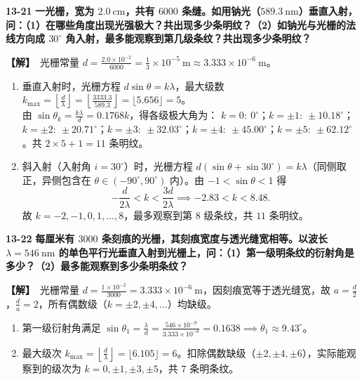 \documentclass[zihao=5,a4paper,UTF8]{ctexart}
\newenvironment{prob}[2]{%
    \par\vspace{6pt}\noindent\textbf{\color{navy}#1} \textbf{#2}\par\nopagebreak\vspace{2pt}%
}{%
    \par\vspace{4pt}%
}
\newcommand{\sol}{\noindent\textbf{\color{tealaccent}【解】}\ }
\begin{document}
\begin{prob}{13-21}{一光栅，宽为 $2.0\ \mathrm{cm}$，共有 $6000$ 条缝。如用钠光（$589.3\ \mathrm{nm}$）垂直入射，问：（1）在哪些角度出现光强极大？共出现多少条明纹？（2）如钠光与光栅的法线方向成 $30^\circ$ 角入射，最多能观察到第几级条纹？共出现多少条明纹？}
\sol 光栅常量 $d = \frac{2.0\times 10^{-2}}{6000} = \frac{1}{3}\times 10^{-5}\ \mathrm{m} \approx 3.333\times 10^{-6}\ \mathrm{m}$。
\begin{enumerate}[leftmargin=2em, itemsep=2pt]
    \item 垂直入射时，光栅方程 $d\sin\theta = k\lambda$，最大级数 $k_{\max} = \left\lfloor\frac{d}{\lambda}\right\rfloor = \left\lfloor\frac{3333.3}{589.3}\right\rfloor = \lfloor 5.656\rfloor = 5$。\\
    由 $\sin\theta_k = \frac{k\lambda}{d} = 0.1768k$，得各级极大角为：
    $k=0:\ 0^\circ$；$k=\pm 1:\ \pm 10.18^\circ$；$k=\pm 2:\ \pm 20.71^\circ$；$k=\pm 3:\ \pm 32.03^\circ$；$k=\pm 4:\ \pm 45.00^\circ$；$k=\pm 5:\ \pm 62.12^\circ$。共 $2\times 5 + 1 = 11$ 条明纹。
    \item 斜入射（入射角 $i=30^\circ$）时，光栅方程 $d(\sin\theta + \sin 30^\circ) = k\lambda$（同侧取正，异侧包含在 $\theta\in(-90^\circ, 90^\circ)$ 内）。由 $-1 < \sin\theta < 1$ 得
    \[
        -\frac{d}{2\lambda} < k < \frac{3d}{2\lambda} \implies -2.83 < k < 8.48.
    \]
    故 $k = -2, -1, 0, 1, \dots, 8$，最多观察到第 $8$ 级条纹，共 $11$ 条明纹。
\end{enumerate}
\end{prob}

\begin{prob}{13-22}{每厘米有 $3000$ 条刻痕的光栅，其刻痕宽度与透光缝宽相等。以波长 $\lambda=546\ \mathrm{nm}$ 的单色平行光垂直入射到光栅上，问：（1）第一级明条纹的衍射角是多少？（2）最多能观察到多少条明条纹？}
\sol 光栅常量 $d = \frac{1\times 10^{-2}}{3000} = 3.333\times 10^{-6}\ \mathrm{m}$，因刻痕宽等于透光缝宽，故 $a = \frac{d}{2}$，$\frac{d}{a} = 2$，所有偶数级（$k = \pm 2, \pm 4, \dots$）均缺级。
\begin{enumerate}[leftmargin=2em, itemsep=2pt]
    \item 第一级衍射角满足 $\sin\theta_1 = \frac{\lambda}{d} = \frac{546\times 10^{-9}}{3.333\times 10^{-6}} = 0.1638 \implies \theta_1 \approx 9.43^\circ$。
    \item 最大级次 $k_{\max} = \left\lfloor\frac{d}{\lambda}\right\rfloor = \lfloor 6.105\rfloor = 6$。扣除偶数缺级（$\pm 2, \pm 4, \pm 6$），实际能观察到的级次为 $k = 0, \pm 1, \pm 3, \pm 5$，共 $7$ 条明条纹。
\end{enumerate}
\end{prob}
\end{document}
